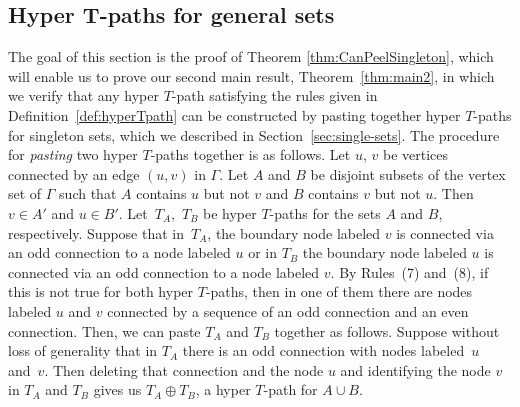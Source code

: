 \documentclass[10pt,a4paper]{amsart}
\numberwithin{equation}{section}
\begin{document}
\subsection[Hyper T-paths for general sets]{Hyper $\boldsymbol{T}$-paths for general sets}\label{sec:gen-sets}
The goal of this section is the proof of Theorem \ref{thm:CanPeelSingleton}, which will enable us to prove our second main result, Theorem~\ref{thm:main2}, in which we verify that any hyper $T$-path satisfying the rules given in Definition~\ref{def:hyperTpath} can be constructed by pasting together hyper $T$-paths for singleton sets, which we described in Section~\ref{sec:single-sets}.
The procedure for \emph{pasting} two hyper $T$-paths together is as follows. Let $u$, $v$ be vertices connected by an edge $(u,v)$ in $\Gamma$. Let $A$ and $B$ be disjoint subsets of the vertex set of $\Gamma$ such that $A$ contains $u$ but not $v$ and $B$ contains $v$ but not $u$. Then $v \in A'$ and $u \in B'$. Let~$T_A$,~$T_B$ be hyper $T$-paths for the sets $A$ and $B$, respectively. Suppose that in~$T_A$, the boundary node labeled $v$ is connected via an odd connection to a node labeled $u$ or in $T_B$ the boundary node labeled $u$ is connected via an odd connection to a node labeled $v$. By Rules~(7) and~(8), if this is not true for both hyper $T$-paths, then in one of them there are nodes labeled $u$ and $v$ connected by a sequence of an odd connection and an even connection. Then, we can paste $T_A$ and $T_B$ together as follows. Suppose without loss of generality that in $T_A$ there is an odd connection with nodes labeled~$u$ and~$v$. Then deleting that connection and the node $u$ and identifying the node $v$ in $T_A$ and $T_B$ gives us $T_A\oplus T_B$, a hyper $T$-path for $A \cup B$.
\end{document}
